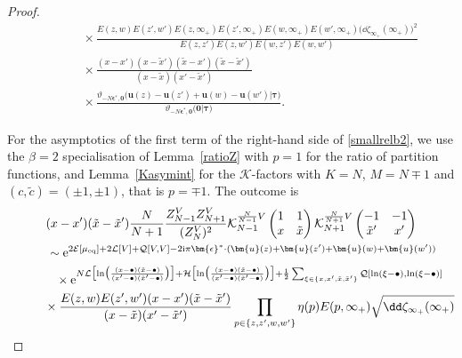 \documentclass[pdftex]{sigma}
\numberwithin{equation}{section}
\begin{document}
\begin{proof}
\begin{gather}
\qquad\quad{} \times{}\frac{E(z,w)E(z',w')E(z,\infty_+)E(z',\infty_+)E(w,\infty_+)E(w',\infty_+)\bigl(\dd \zeta_{\infty_+}(\infty_+)\bigr)^2}{E(z,z')E(z,w')E(w,z')E(w,w')}\nonumber\\
\qquad\quad{} \times{}\frac{(x - x')(x - \tilde{x}')(\tilde{x} - x')(\tilde{x} - \tilde{x}')}{(x - \tilde{x})(x' - \tilde{x}')} \nonumber\\
\qquad\quad{} \times{} \frac{\vartheta_{-N\bm{\epsilon}^*,\bm{0}}\bigl(\bm{u}(z) - \bm{u}(z') + \bm{u}(w) - \bm{u}(w')\big|\bm{\tau}\bigr)}{\vartheta_{-N\bm{\epsilon}^*,\bm{0}}\bigl(\bm{0}\big|\bm{\tau}\bigr)}.\label{T1}
\end{gather}

For the asymptotics of the first term of the right-hand side of \eqref{smallrelb2}, we use the $\beta = 2$ specialisation of Lemma~\ref{ratioZ} with $p = 1$ for the ratio of partition functions, and Lemma~\ref{Kasymint} for the $\mathcal{K}$-factors with $K = N$, $M = N \mp 1$ and $(c,\tilde{c}) = (\pm 1,\pm 1)$, that is $p = \mp 1$. The outcome is
\begin{gather}
  (x - x')(\tilde{x} - \tilde{x}')\frac{N}{N + 1} \frac{Z_{N - 1}^{V}Z_{N + 1}^{V}}{(Z_N^V)^2} \mathcal{K}^{\frac{N}{N - 1}V}_{N - 1}\left(\begin{matrix} 1 & 1 \\ x & \tilde{x} \end{matrix}\right) \mathcal{K}^{\frac{N}{N + 1}V}_{N + 1}\left(\begin{matrix} -1 & -1 \\ \tilde{x}' & x' \end{matrix}\right) \nonumber \\
 \qquad \sim{\rm e}^{2\mathcal{E}[\mu_{{\rm eq}}] + 2\mathcal{L}[V] + \mathcal{Q}[V,V] - 2{\rm i}\pi \bm{\epsilon}^* \cdot(\bm{u}(z) + \bm{u}(z') + \bm{u}(w) + \bm{u}(w'))} \nonumber \\
\qquad\quad {}\times{\rm e}^{N\mathcal{L}\bigl[\ln\bigl(\frac{(x - \bullet)(\tilde{x} - \bullet)}{(x' - \bullet)(\tilde{x}' - \bullet)}\bigr)\bigr] + \mathcal{H}\bigl[\ln\bigl(\frac{(x - \bullet)(\tilde{x} - \bullet)}{(x' - \bullet)(\tilde{x}' - \bullet)}\bigr)\bigr] + \frac{1}{2} \sum_{\xi \in \{x,x',\tilde{x},\tilde{x}'\}} \mathcal{Q}[\ln(\xi - \bullet),\ln(\xi - \bullet)]} \nonumber\\
\qquad\quad {}  \times \frac{E(z,w)E(z',w')(x - x')(\tilde{x} - \tilde{x}')}{(x - \tilde{x})(x' - \tilde{x}')} \prod_{p \in \{z,z',w,w'\}} \eta(p)E(p,\infty_+) \sqrt{\dd \zeta_{\infty_+}(\infty_+)}\nonumber\\

\end{gather}
\end{proof}
\end{document}
